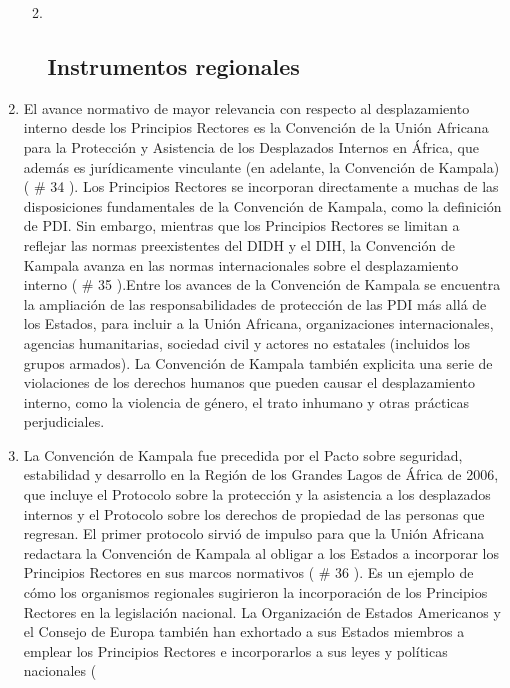 \documentclass[
]{book}
\begin{document}
\begin{enumerate}
  \begin{enumerate}
  \def\labelenumii{\arabic{enumii}.}
  \item ~
    \hypertarget{instrumentos-regionales}{%
    \subsection{Instrumentos regionales}\label{instrumentos-regionales}}
  \end{enumerate}
\item
  El avance normativo de mayor relevancia con respecto al desplazamiento interno desde los Principios Rectores es la Convención de la Unión Africana para la Protección y Asistencia de los Desplazados Internos en África, que además es jurídicamente vinculante (en adelante, la Convención de Kampala) (
  \# 34
  ). Los Principios Rectores se incorporan directamente a muchas de las disposiciones fundamentales de la Convención de Kampala, como la definición de PDI. Sin embargo, mientras que los Principios Rectores se limitan a reflejar las normas preexistentes del DIDH y el DIH, la Convención de Kampala avanza en las normas internacionales sobre el desplazamiento interno (
  \# 35
  ).Entre los avances de la Convención de Kampala se encuentra la ampliación de las responsabilidades de protección de las PDI más allá de los Estados, para incluir a la Unión Africana, organizaciones internacionales, agencias humanitarias, sociedad civil y actores no estatales (incluidos los grupos armados). La Convención de Kampala también explicita una serie de violaciones de los derechos humanos que pueden causar el desplazamiento interno, como la violencia de género, el trato inhumano y otras prácticas perjudiciales.
\item
  La Convención de Kampala fue precedida por el Pacto sobre seguridad, estabilidad y desarrollo en la Región de los Grandes Lagos de África de 2006, que incluye el Protocolo sobre la protección y la asistencia a los desplazados internos y el Protocolo sobre los derechos de propiedad de las personas que regresan. El primer protocolo sirvió de impulso para que la Unión Africana redactara la Convención de Kampala al obligar a los Estados a incorporar los Principios Rectores en sus marcos normativos (
  \# 36
  ). Es un ejemplo de cómo los organismos regionales sugirieron la incorporación de los Principios Rectores en la legislación nacional. La Organización de Estados Americanos y el Consejo de Europa también han exhortado a sus Estados miembros a emplear los Principios Rectores e incorporarlos a sus leyes y políticas nacionales (

\end{enumerate}
\end{document}
